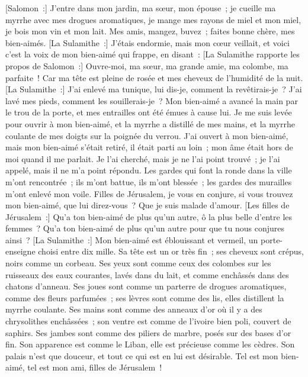 \begin{multicols}{2}
\VerseOne{}[Salomon~:] J'entre dans mon jardin, ma sœur, mon épouse~; je cueille ma myrrhe avec mes drogues aromatiques, je mange mes rayons de miel et mon miel, je bois mon vin et mon lait. Mes amis, mangez, buvez~; faites bonne chère, mes bien-aimés.
[La Sulamithe~:] J'étais endormie, mais mon cœur veillait, et voici c'est la voix de mon bien-aimé qui frappe, en disant~: [La Sulamithe rapporte les propos de Salomon~:] Ouvre-moi, ma sœur, ma grande amie, ma colombe, ma parfaite~! Car ma tête est pleine de rosée et mes cheveux de l'humidité de la nuit.
[La Sulamithe~:] J'ai enlevé ma tunique, lui dis-je, comment la revêtirais-je~? J'ai lavé mes pieds, comment les souillerais-je~?
Mon bien-aimé a avancé la main par le trou de la porte, et mes entrailles ont été émues à cause lui.
Je me suis levée pour ouvrir à mon bien-aimé, et la myrrhe a distillé de mes mains, et la myrrhe coulante de mes doigts sur la poignée du verrou.
J'ai ouvert à mon bien-aimé, mais mon bien-aimé s'était retiré, il était parti au loin~; mon âme était hors de moi quand il me parlait. Je l'ai cherché, mais je ne l'ai point trouvé~; je l'ai appelé, mais il ne m'a point répondu.
Les gardes qui font la ronde dans la ville m'ont rencontrée~; ils m'ont battue, ils m'ont blessée~; les gardes des murailles m'ont enlevé mon voile.
Filles de Jérusalem, je vous en conjure, si vous trouvez mon bien-aimé, que lui direz-vous~? Que je suis malade d'amour.
[Les filles de Jérusalem~:] Qu'a ton bien-aimé de plus qu'un autre, ô la plus belle d'entre les femmes~? Qu'a ton bien-aimé de plus qu'un autre pour que tu nous conjures ainsi~?
[La Sulamithe~:] Mon bien-aimé est éblouissant et vermeil, un porte-enseigne choisi entre dix mille.
Sa tête est un or très fin~; ses cheveux sont crépus, noirs comme un corbeau.
Ses yeux sont comme ceux des colombes sur les ruisseaux des eaux courantes, lavés dans du lait, et comme enchâssés dans des chatons d'anneau. 
Ses joues sont comme un parterre de drogues aromatiques, comme des fleurs parfumées~; ses lèvres sont comme des lis, elles distillent la myrrhe coulante. 
Ses mains sont comme des anneaux d'or où il y a des chrysolithes enchâssées~; son ventre est comme de l'ivoire bien poli, couvert de saphirs.
Ses jambes sont comme des piliers de marbre, posés sur des bases d'or fin. Son apparence est comme le Liban, elle est précieuse comme les cèdres.
Son palais n'est que douceur, et tout ce qui est en lui est désirable. Tel est mon bien-aimé, tel est mon ami, filles de Jérusalem~!

\end{multicols}
